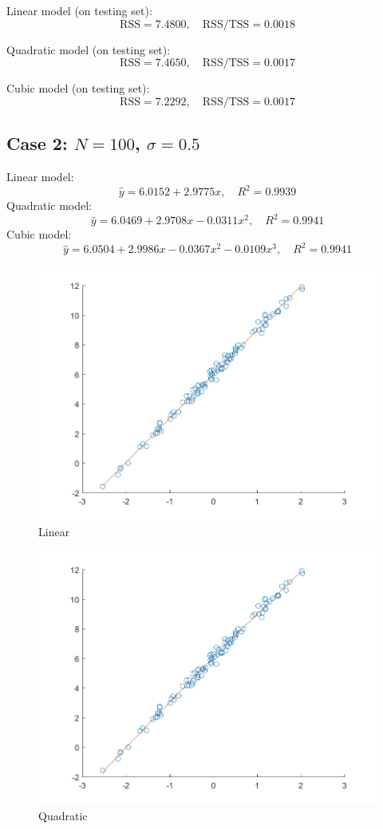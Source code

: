 \documentclass{article}
\begin{document}
{{        Linear model (on testing set): $$\mathrm{RSS} = 7.4800, \quad \mathrm{RSS}/\mathrm{TSS} = 0.0018$$

        Quadratic model (on testing set): $$\mathrm{RSS} = 7.4650, \quad \mathrm{RSS}/\mathrm{TSS} = 0.0017$$

        Cubic model (on testing set): $$\mathrm{RSS} = 7.2292, \quad \mathrm{RSS}/\mathrm{TSS} = 0.0017$$
    }

    \subsection*{Case 2: $N=100$, $\sigma = 0.5$}
    {
        Linear model: $$\hat{y} = 6.0152 + 2.9775x ,\quad R^2 = 0.9939$$
        Quadratic model: $$\hat{y} = 6.0469 + 2.9708x - 0.0311x^2 ,\quad R^2 = 0.9941$$
        Cubic model: $$\hat{y} = 6.0504 + 2.9986x - 0.0367x^2 - 0.0109x^3 ,\quad R^2 = 0.9941$$

        \begin{figure}[H]
            \centering
            \includegraphics[width = 0.6\linewidth]{2-2-linear-100-0.5.png}
            \caption{Linear}
        \end{figure}

        \begin{figure}[H]
            \centering
            \includegraphics[width = 0.6\linewidth]{2-2-quadratic-100-0.5.png}
            \caption{Quadratic}
        \end{figure}

}}
\end{document}
